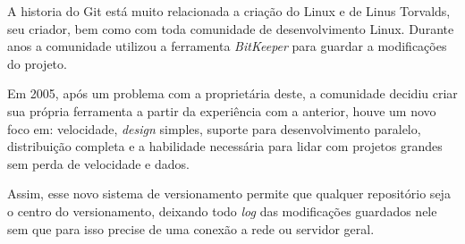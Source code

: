 A historia do Git está muito relacionada a criação do Linux e de Linus Torvalds, seu criador, bem como com toda comunidade de desenvolvimento Linux. Durante anos a comunidade utilizou a ferramenta \textit{BitKeeper} para guardar a modificações do projeto.

Em 2005, após um problema com a proprietária deste, a comunidade decidiu criar sua própria ferramenta a partir da experiência com a anterior, houve um novo foco em: velocidade, \textit{design} simples, suporte para desenvolvimento paralelo, distribuição completa e a habilidade necessária para lidar com projetos grandes sem perda de velocidade e dados.

Assim, esse novo sistema de versionamento permite que qualquer repositório seja o centro do versionamento, deixando todo \textit{log} das modificações guardados nele sem que para isso precise de uma conexão a rede ou servidor geral.
